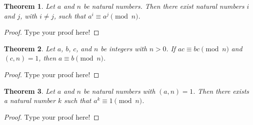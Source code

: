 \documentclass[12pt,leqno]{article}
\numberwithin{equation}{section}
\newtheorem{thm}{Theorem}[section]
\theoremstyle{definition}
\begin{document}

\begin{thm}
Let $a$ and $n$ be natural numbers.  Then there exist natural
numbers $i$ and $j$, with $i \neq j$, such that $a^i \equiv a^j
\pmod{n}$.
\end{thm}
\begin{proof}[Proof]
Type your proof here!
\end{proof}


\begin{thm}
Let $a$, $b$, $c$, and $n$ be integers with $n
> 0$.  If $ac \equiv bc \pmod{n}$ and $(c, n) = 1$, then $a \equiv b
\pmod{n}$.
\end{thm}
\begin{proof}[Proof]
Type your proof here!
\end{proof}


\begin{thm}
Let $a$ and $n$ be natural numbers with $(a, n) = 1$.  Then there
exists a natural number $k$ such that $a^k \equiv 1 \pmod{n}$.
\end{thm}
\begin{proof}[Proof]
Type your proof here!
\end{proof}
\end{document}
